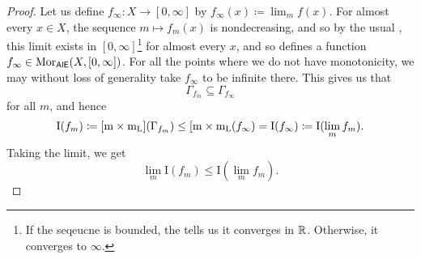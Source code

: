 \begin{thm}[Integral]
\begin{savenotes}
\begin{proof}
Let us define $f_\infty :X\rightarrow [0,\infty ]$ by $f_\infty (x)\coloneqq \lim _mf(x)$.  For almost every $x\in X$, the sequence $m\mapsto f_m(x)$ is nondecreasing, and so by the usual , this limit exists in $[0,\infty ]$\footnote{If the seqeucne is bounded, the  tells us it converges in $\mathbb{R}$.  Otherwise, it converges to $\infty$.} for almost every $x$, and so defines a function $f_\infty \in \operatorname{Mor} _{\mathsf{AlE}}(X,[0,\infty ])$.  For all the points where we do not have monotonicity, we may without loss of generality take $f_\infty$ to be infinite there.  This gives us that
\begin{equation}
\Gamma _{f_m}\subseteq \Gamma _{f_\infty}
\end{equation}
for all $m$, and hence
\begin{equation}
\mathrm{I}(f_m)\coloneqq [\mathrm{m} \times \mathrm{m}_{\mathrm{L}}](\Gamma _{f_m})\leq [\mathrm{m} \times \mathrm{m} _{\mathrm{L}}(f_\infty)=\mathrm{I}(f_\infty )\coloneqq \mathrm{I}(\lim _mf_m).
\end{equation}
Taking the limit, we get
\begin{equation}
\lim _m\mathrm{I}(f_m)\leq \mathrm{I}(\lim _mf_m).
\end{equation}


\end{proof}
\end{savenotes}
\end{thm}